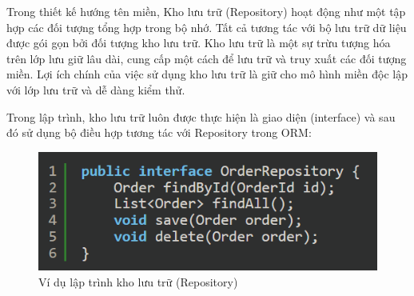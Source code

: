 Trong thiết kế hướng tên miền, Kho lưu trữ (Repository) hoạt động như một tập hợp các đối tượng tổng hợp trong bộ nhớ. Tất cả tương tác với bộ lưu trữ dữ liệu được gói gọn bởi đối tượng kho lưu trữ. Kho lưu trữ là một sự trừu tượng hóa trên lớp lưu giữ lâu dài, cung cấp một cách để lưu trữ và truy xuất các đối tượng miền. Lợi ích chính của việc sử dụng kho lưu trữ là giữ cho mô hình miền độc lập với lớp lưu trữ và dễ dàng kiểm thử.





\begin{example} Trong lập trình, kho lưu trữ luôn được thực hiện là giao diện (interface) và sau đó sử dụng bộ điều hợp tương tác với Repository trong ORM:

\begin{figure}[H]

\centering

\includegraphics[scale = 0.8]{pictures/_vi_du_lap_trinh_kho_luu_tru_repository/main.png}

\caption{Ví dụ lập trình kho lưu trữ (Repository)}

\end{figure}

\end{example}